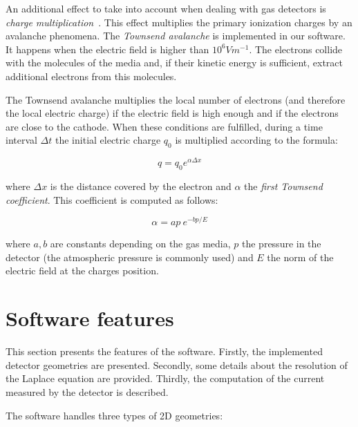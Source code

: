 \documentclass[11pt]{article}
\begin{document}
	An additional effect to take into account  when dealing with gas detectors is
	\textit{charge multiplication}~\cite{lphy2236}. This effect
	multiplies the primary ionization charges by an avalanche phenomena.
	The \textit{Townsend avalanche} is implemented in our software. It happens
	when the electric field is higher than $10^6Vm^{-1}$. The electrons collide
	with the molecules of the media and, if their kinetic energy is sufficient,
	extract additional electrons from this molecules.

	The Townsend avalanche multiplies the local number of electrons (and therefore the local electric
	charge) if the electric field is high enough and if the electrons are close
	to the cathode. When these conditions are fulfilled, during a time interval
	$\Delta t$ the initial electric charge $q_0$ is multiplied
	according to the formula:

	\begin{equation}
		q = q_0 e^{\alpha \Delta x}
		\label{eq:townsend}
	\end{equation}

	where $\Delta x$ is the distance covered by the electron and $\alpha$ the
	\textit{first Townsend coefficient}. This coefficient is computed as follows:

	\[\alpha = ap \ e^{-bp/E}\]

	where $a, b$ are constants depending on the gas media, $p$ the pressure in
	the detector (the atmospheric pressure is commonly used) and $E$ the norm
	of the electric field at the charges position.

\section{Software features}
\label{sec:features}

	This section presents the features of the software. Firstly,
	the implemented detector geometries are presented. Secondly, some details
	about the resolution of the Laplace equation are provided. Thirdly, the
	computation of the current measured by the detector is described.

	The software handles three types of 2D geometries:
\end{document}
